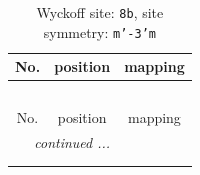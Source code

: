 \documentclass[fleqn,8pt]{jsarticle}
\begin{document}
\renewcommand{\arraystretch}{1.2}
\begin{longtable}{ccc}
\caption{Wyckoff site: {\tt 8b}, site symmetry: {\tt m'-3'm}}
 \\
 \hline \hline
No. & position & mapping \\ \hline \endfirsthead

\multicolumn{2}{l}{\tablename\ \thetable{}} \\
 \hline \hline
No. & position & mapping \\ \hline \endhead

 \hline \hline
\multicolumn{2}{r}{\footnotesize\it continued ...} \\ \endfoot

 \hline \hline
\multicolumn{2}{r}{} \\ \endlastfoot


\end{longtable}
\end{document}
